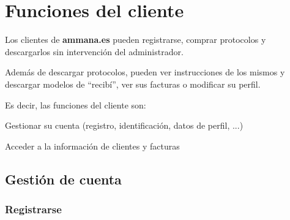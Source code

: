 \documentclass[12pt, spanish]{article}
\begin{document}

    \section{Funciones del cliente}

            Los clientes de \textbf{ammana.es} pueden registrarse, comprar protocolos y 
        descargarlos sin intervención del administrador.

            Además de descargar protocolos, pueden ver instrucciones de los mismos y descargar
        modelos de ``recibí'', ver sus facturas o modificar su perfil.

        Es decir, las funciones del cliente son:

        \begin{steps}
            \item Gestionar su cuenta (registro, identificación, datos de perfil, ...)
            \item Acceder a la información de clientes y facturas
        \end{steps}


    \subsection{Gestión de cuenta}


    \subsubsection{Registrarse}

    \label{sec:registro}
\end{document}

